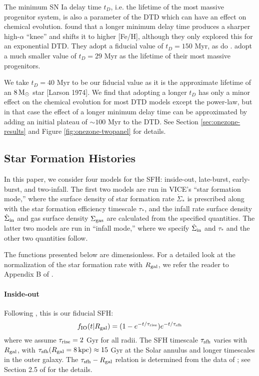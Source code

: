 \documentclass[twocolumn,twocolappendix,linenumbers]{aastex631}
\begin{document}
The minimum SN Ia delay time $t_D$, i.e. the lifetime of the most massive progenitor system, is also a parameter of the DTD which can have an effect on chemical evolution. \citet{Andrews2017-ChemicalEvolution} found that a longer minimum delay time produces a sharper high-$\alpha$ ``knee'' and shifts it to higher [Fe/H], although they only explored this for an exponential DTD. They adopt a fiducial value of $t_D=150$ Myr, as do \citet{Johnson2021-Migration}. \citet{Poulhazan2018-PrecisionPollution} adopt a much smaller value of $t_D=29$ Myr as the lifetime of their most massive progenitors.

We take $t_D=40$ Myr to be our fiducial value as it is the approximate lifetime of an $8\,{\rm M}_\odot$ star [Larson 1974]. We find that adopting a longer $t_D$ has only a minor effect on the chemical evolution for most DTD models except the power-law, but in that case the effect of a longer minimum delay time can be approximated by adding an initial plateau of $\sim100$ Myr to the DTD. See Section \ref{sec:onezone-results} and Figure \ref{fig:onezone-twopanel} for details.

\subsection{Star Formation Histories}
\label{sec:sfh}

In this paper, we consider four models for the SFH: inside-out, late-burst, early-burst, and two-infall. The first two models are run in VICE's ``star formation mode,'' where the surface density of star formation rate $\dot\Sigma_*$ is prescribed along with the star formation efficiency timescale $\tau_*$, and the infall rate surface density $\dot\Sigma_{\rm in}$ and gas surface density $\Sigma_{\rm gas}$ are calculated from the specified quantities. The latter two models are run in ``infall mode,'' where we specify $\dot\Sigma_{\rm in}$  and $\tau_*$ and the other two quantities follow. 

The functions presented below are dimensionless. For a detailed look at the normalization of the star formation rate with $R_{\rm gal}$, we refer the reader to Appendix B of \citet{Johnson2021-Migration}.

\paragraph{Inside-out} Following \citet{Johnson2021-Migration}, this is our fiducial SFH:
\begin{equation}
    f_{\rm IO}(t|R_{\rm gal}) = (1 - e^{-t/\tau_{\rm rise}}) e^{-t/\tau_{\rm sfh}}
    \label{eq:insideout-sfh}
\end{equation}
where we assume $\tau_{\rm rise}=2$ Gyr for all radii. The SFH timescale $\tau_{\rm sfh}$ varies with $R_{\rm gal}$, with $\tau_{\rm sfh}(R_{\rm gal}=8\,\rm{kpc})\approx15$ Gyr at the Solar annulus and longer timescales in the outer galaxy. The $\tau_{\rm sfh} - R_{\rm gal}$ relation is determined from the data of \citet{Sanchez2020-StarFormationTimescales}; see Section 2.5 of \citet{Johnson2021-Migration} for the details.
\end{document}

